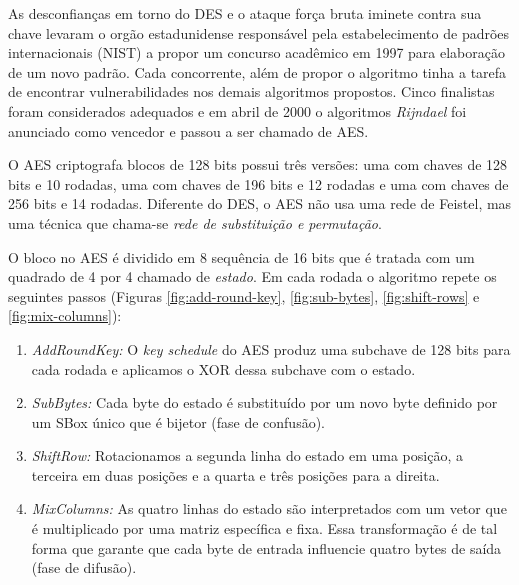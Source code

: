 As desconfianças em torno do DES e o ataque força bruta iminete contra sua chave levaram o orgão estadunidense responsável pela estabelecimento de padrões internacionais (NIST) a propor um concurso acadêmico em 1997 para elaboração de um novo padrão.
Cada concorrente, além de propor o algoritmo tinha a tarefa de encontrar vulnerabilidades nos demais algoritmos propostos.
Cinco finalistas foram considerados adequados e em abril de 2000 o algoritmos {\em Rijndael} foi anunciado como vencedor e passou a ser chamado de AES.

O AES criptografa blocos de 128 bits possui três versões: uma com chaves de 128 bits e 10 rodadas, uma com chaves de 196 bits e 12 rodadas e uma com chaves de 256 bits e 14 rodadas.
Diferente do DES, o AES não usa uma rede de Feistel, mas uma técnica que chama-se {\em rede de substituição e permutação}.

O bloco no AES é dividido em 8 sequência de 16 bits que é tratada com um quadrado de 4 por 4 chamado de {\em estado}.
Em cada rodada o algoritmo repete os seguintes passos (Figuras \ref{fig:add-round-key}, \ref{fig:sub-bytes}, \ref{fig:shift-rows} e \ref{fig:mix-columns}):
\begin{enumerate}
\item {\em AddRoundKey:} O {\em key schedule} do AES produz uma subchave de 128 bits para cada rodada e aplicamos o XOR dessa subchave com o estado.
\item {\em SubBytes:} Cada byte do estado é substituído por um novo byte definido por um SBox único que é bijetor (fase de confusão).
\item {\em ShiftRow:} Rotacionamos a segunda linha do estado em uma posição, a terceira em duas posições e a quarta e três posições para a direita.
\item {\em MixColumns:} As quatro linhas do estado são interpretados com um vetor que é multiplicado por uma matriz específica e fixa. Essa transformação é de tal forma que garante que cada byte de entrada influencie quatro bytes de saída (fase de difusão). 
\end{enumerate}

